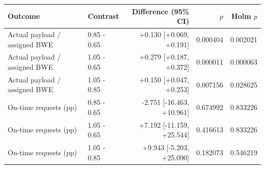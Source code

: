 \begin{tabular}{llrrr}
\toprule
Outcome & Contrast & Difference (95\% CI) & $p$ & Holm $p$ \\
\midrule
Actual payload / assigned BWE & 0.85 - 0.65 & +0.130 [+0.069, +0.191] & 0.000404 & 0.002021 \\
Actual payload / assigned BWE & 1.05 - 0.65 & +0.279 [+0.187, +0.372] & 0.000011 & 0.000063 \\
Actual payload / assigned BWE & 1.05 - 0.85 & +0.150 [+0.047, +0.253] & 0.007156 & 0.028625 \\
On-time requests (pp) & 0.85 - 0.65 & -2.751 [-16.463, +10.961] & 0.674992 & 0.833226 \\
On-time requests (pp) & 1.05 - 0.65 & +7.192 [-11.159, +25.544] & 0.416613 & 0.833226 \\
On-time requests (pp) & 1.05 - 0.85 & +9.943 [-5.203, +25.090] & 0.182073 & 0.546219 \\
\bottomrule
\end{tabular}
